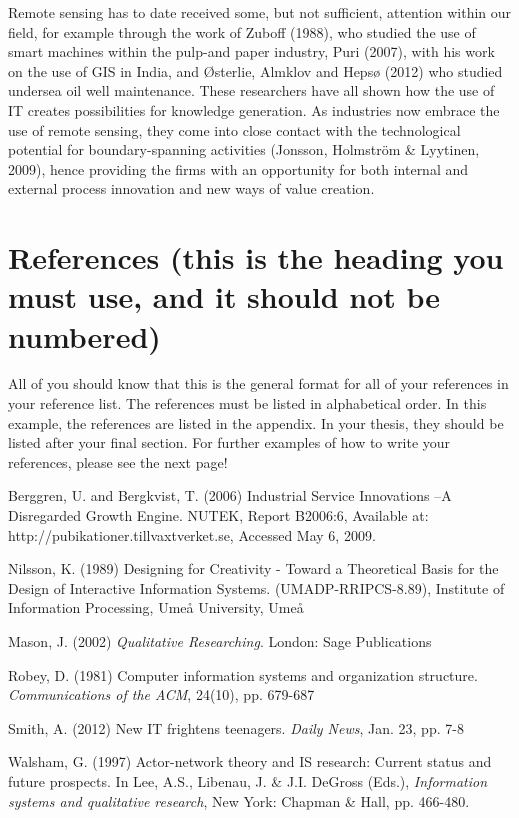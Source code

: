 \documentclass[]{article}
\begin{document}
Remote sensing has to date received some, but not sufficient, attention
within our field, for example through the work of Zuboff (1988), who
studied the use of smart machines within the pulp-and paper industry,
Puri (2007), with his work on the use of GIS in India, and Østerlie,
Almklov and Hepsø (2012) who studied undersea oil well maintenance.
These researchers have all shown how the use of IT creates possibilities
for knowledge generation. As industries now embrace the use of remote
sensing, they come into close contact with the technological potential
for boundary-spanning activities (Jonsson, Holmström \& Lyytinen, 2009),
hence providing the firms with an opportunity for both internal and
external process innovation and new ways of value creation.

\section{References (this is the heading you must use, and it should not
be
numbered)}\label{references-this-is-the-heading-you-must-use-and-it-should-not-be-numbered}

All of you should know that this is the general format for all of your
references in your reference list. The references must be listed in
alphabetical order. In this example, the references are listed in the
appendix. In your thesis, they should be listed after your final section.
For further examples of how to write your references, please see the
next page!

Berggren, U. and Bergkvist, T. (2006) Industrial Service Innovations --A
Disregarded Growth Engine. NUTEK, Report B2006:6, Available at:
http://pubikationer.tillvaxtverket.se, Accessed May 6, 2009.

Nilsson, K. (1989) Designing for Creativity - Toward a Theoretical Basis
for the Design of Interactive Information Systems. (UMADP-RRIPCS-8.89),
Institute of Information Processing, Umeå University, Umeå

Mason, J. (2002) \emph{Qualitative Researching}. London: Sage
Publications

Robey, D. (1981) Computer information systems and organization
structure. \emph{Communications of the ACM}, 24(10), pp. 679-687

Smith, A. (2012) New IT frightens teenagers. \emph{Daily News}, Jan. 23,
pp. 7-8

Walsham, G. (1997) Actor-network theory and IS research: Current status
and future prospects. In Lee, A.S., Libenau, J. \& J.I. DeGross (Eds.),
\emph{Information systems and qualitative research}, New York: Chapman
\& Hall, pp. 466-480.
\end{document}
